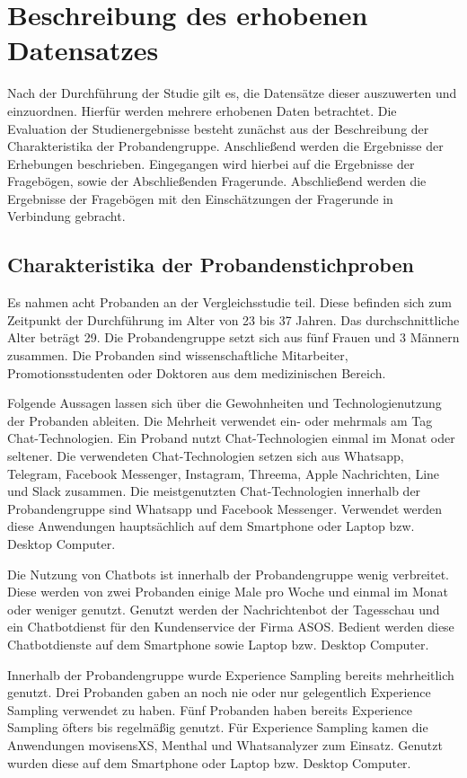 \section{Beschreibung des erhobenen Datensatzes}
Nach der Durchführung der Studie gilt es, die Datensätze dieser auszuwerten und einzuordnen. Hierfür werden mehrere erhobenen Daten betrachtet. Die Evaluation der Studienergebnisse besteht zunächst aus der Beschreibung der Charakteristika der Probandengruppe. Anschließend werden die Ergebnisse der Erhebungen beschrieben. Eingegangen wird hierbei auf die Ergebnisse der Fragebögen, sowie der Abschließenden Fragerunde. Abschließend werden die Ergebnisse der Fragebögen mit den Einschätzungen der Fragerunde in Verbindung gebracht. 


\subsection{Charakteristika der Probandenstichproben}
Es nahmen acht Probanden an der Vergleichsstudie teil. Diese befinden sich zum Zeitpunkt der Durchführung im Alter von 23 bis 37 Jahren. Das durchschnittliche Alter beträgt 29. Die Probandengruppe setzt sich aus fünf Frauen und 3 Männern zusammen. Die Probanden sind wissenschaftliche Mitarbeiter, Promotionsstudenten oder Doktoren aus dem medizinischen Bereich. 

Folgende Aussagen lassen sich über die Gewohnheiten und Technologienutzung der Probanden ableiten. Die Mehrheit verwendet ein- oder mehrmals am Tag Chat-Technologien. Ein Proband nutzt Chat-Technologien 
einmal im Monat oder seltener. Die verwendeten Chat-Technologien setzen sich aus Whatsapp, Telegram, Facebook Messenger, Instagram, Threema, Apple Nachrichten, Line und Slack zusammen. Die meistgenutzten Chat-Technologien innerhalb der Probandengruppe sind Whatsapp und Facebook Messenger. Verwendet werden diese Anwendungen hauptsächlich auf dem Smartphone oder Laptop bzw. Desktop Computer. 

Die Nutzung von Chatbots ist innerhalb der Probandengruppe wenig verbreitet. Diese werden von zwei Probanden einige Male pro Woche und einmal im Monat oder weniger genutzt. Genutzt werden der Nachrichtenbot der Tagesschau und ein Chatbotdienst für den Kundenservice der Firma ASOS. Bedient werden diese Chatbotdienste auf dem Smartphone sowie Laptop bzw. Desktop Computer. 

Innerhalb der Probandengruppe wurde Experience Sampling bereits mehrheitlich genutzt. Drei Probanden gaben an noch nie oder nur gelegentlich Experience Sampling verwendet zu haben. Fünf Probanden haben bereits Experience Sampling öfters bis regelmäßig genutzt. Für Experience Sampling kamen die Anwendungen movisensXS, Menthal und Whatsanalyzer zum Einsatz. Genutzt wurden diese auf dem Smartphone oder Laptop bzw. Desktop Computer. 

